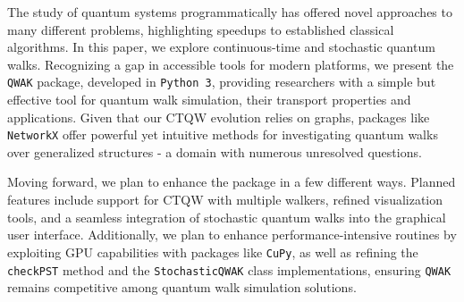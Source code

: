\documentclass[main.tex]{subfiles}
\begin{document}
The study of quantum systems programmatically has offered novel approaches to
many different problems, highlighting speedups to established classical
algorithms. In this paper, we explore continuous-time and stochastic quantum
walks. Recognizing a gap in accessible tools for modern platforms, we present
the \texttt{QWAK} package, developed in \texttt{Python 3}, providing
researchers with a simple but effective tool for quantum walk simulation, their
transport properties and applications. Given that our CTQW evolution relies on
graphs, packages like \texttt{NetworkX} offer powerful yet intuitive 
methods for investigating quantum walks over generalized structures - a domain
with numerous unresolved questions.


Moving forward, we plan to enhance the package in a few different ways.
Planned features include support for CTQW with multiple walkers, refined
visualization tools, and a seamless integration of stochastic quantum walks
into the graphical user interface.  Additionally, we plan to enhance
performance-intensive routines by exploiting GPU capabilities with packages
like \texttt{CuPy}, as well as refining the \texttt{checkPST} method and the
\texttt{StochasticQWAK} class implementations, ensuring \texttt{QWAK} remains
competitive among quantum walk simulation solutions.
\end{document}
